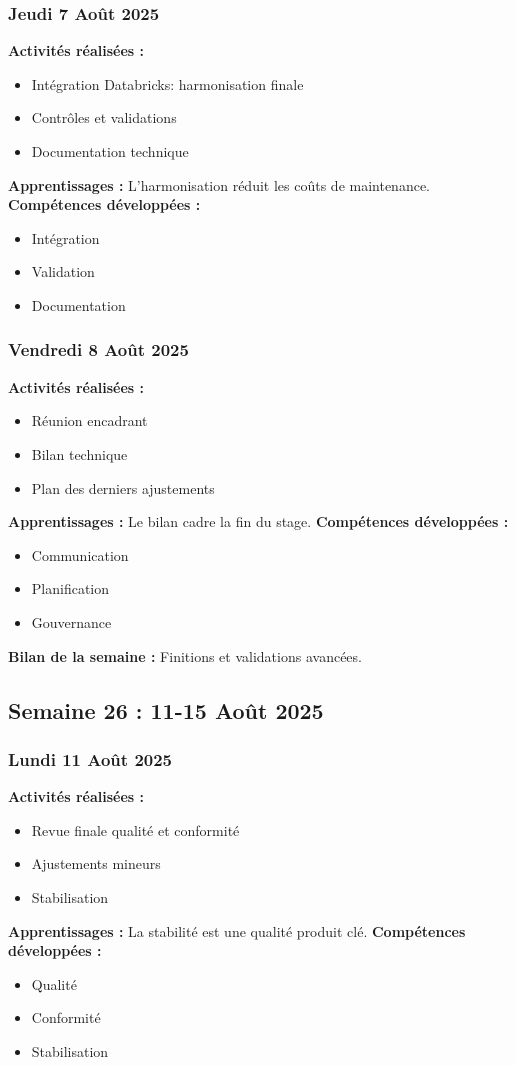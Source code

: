 \documentclass[12pt,a4paper]{article}
\begin{document}
\subsubsection{Jeudi 7 Août 2025}
\textbf{Activités réalisées :}
\begin{itemize}
    \item Intégration Databricks: harmonisation finale
    \item Contrôles et validations
    \item Documentation technique
\end{itemize}
\textbf{Apprentissages :} L'harmonisation réduit les coûts de maintenance.
\textbf{Compétences développées :}
\begin{itemize}
    \item Intégration
    \item Validation
    \item Documentation
\end{itemize}

\subsubsection{Vendredi 8 Août 2025}
\textbf{Activités réalisées :}
\begin{itemize}
    \item Réunion encadrant
    \item Bilan technique
    \item Plan des derniers ajustements
\end{itemize}
\textbf{Apprentissages :} Le bilan cadre la fin du stage.
\textbf{Compétences développées :}
\begin{itemize}
    \item Communication
    \item Planification
    \item Gouvernance
\end{itemize}
\textbf{Bilan de la semaine :} Finitions et validations avancées.

\clearpage
\subsection{Semaine 26 : 11-15 Août 2025}

\subsubsection{Lundi 11 Août 2025}
\textbf{Activités réalisées :}
\begin{itemize}
    \item Revue finale qualité et conformité
    \item Ajustements mineurs
    \item Stabilisation
\end{itemize}
\textbf{Apprentissages :} La stabilité est une qualité produit clé.
\textbf{Compétences développées :}
\begin{itemize}
    \item Qualité
    \item Conformité
    \item Stabilisation
\end{itemize}
\end{document}

